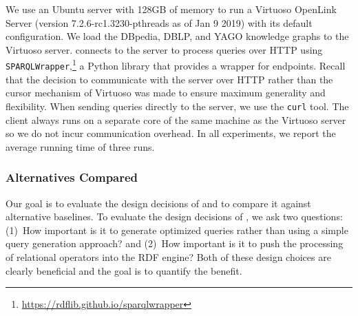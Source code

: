 \vspace*{4pt}
We use an Ubuntu server with 128GB of memory
to
run a Virtuoso OpenLink Server (version 7.2.6-rc1.3230-pthreads as of Jan 9 2019) with its default configuration.
We load the DBpedia, DBLP, and YAGO knowledge graphs to the Virtuoso server. \rdfframes connects to the server to process \sparql queries over HTTP using \texttt{SPARQLWrapper},\footnote{\url{https://rdflib.github.io/sparqlwrapper}}
a Python library that provides
a wrapper for \sparql endpoints.
Recall that the decision to communicate with the server over HTTP rather than the cursor mechanism of Virtuoso was made to ensure maximum generality and flexibility.
When sending \sparql queries directly to the server, we use the \texttt{curl} tool.
The client always runs on a separate core of the same machine as the Virtuoso server so we do not incur communication overhead. In all experiments, we report the average running time of three runs.

\vspace*{3pt}
\subsubsection{Alternatives Compared}

\vspace*{4pt}
Our goal is to evaluate the design decisions of \rdfframes
and to compare it against alternative baselines.
To evaluate the design decisions of \rdfframes,
we ask two questions:
(1)~How important is it to generate optimized \sparql queries rather than using a simple query generation approach?
and
(2)~How important is it to push the processing of relational operators into the RDF engine?
Both of these design choices are clearly beneficial
and the goal is to quantify the benefit.

